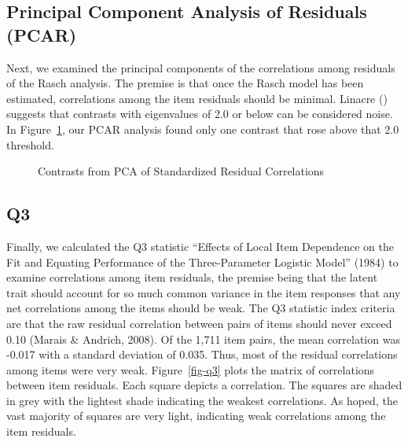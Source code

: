 \documentclass[
  letterpaper,
]{article}
\begin{document}
\subsection*{Principal Component Analysis of Residuals
(PCAR)}\label{principal-component-analysis-of-residuals-pcar}

Next, we examined the principal components of the correlations among
residuals of the Rasch analysis. The premise is that once the Rasch
model has been estimated, correlations among the item residuals should
be minimal. Linacre () suggests that contrasts with eigenvalues of 2.0
or below can be considered noise. In Figure~\ref{fig-pcar}, our PCAR
analysis found only one contrast that rose above that 2.0 threshold.

\begin{figure}


\caption{\label{fig-pcar}Contrasts from PCA of Standardized Residual
Correlations}

\end{figure}%

\subsection*{Q3}\label{q3}

Finally, we calculated the Q3 statistic {``Effects of Local Item
Dependence on the Fit and Equating Performance of the Three-Parameter
Logistic Model''} (1984) to examine correlations among item residuals,
the premise being that the latent trait should account for so much
common variance in the item responses that any net correlations among
the items should be weak. The Q3 statistic index criteria are that the
raw residual correlation between pairs of items should never exceed 0.10
(Marais \& Andrich, 2008). Of the 1,711 item pairs, the mean correlation
was -0.017 with a standard deviation of 0.035. Thus, most of the
residual correlations among items were very weak. Figure~\ref{fig-q3}
plots the matrix of correlations between item residuals. Each square
depicts a correlation. The squares are shaded in grey with the lightest
shade indicating the weakest correlations. As hoped, the vast majority
of squares are very light, indicating weak correlations among the item
residuals.
\end{document}
